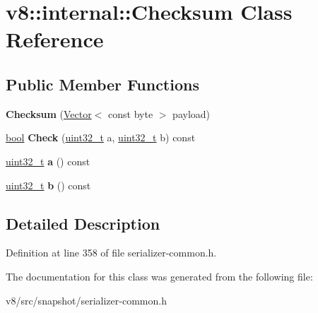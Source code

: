 \hypertarget{classv8_1_1internal_1_1Checksum}{}\section{v8\+:\+:internal\+:\+:Checksum Class Reference}
\label{classv8_1_1internal_1_1Checksum}
\subsection*{Public Member Functions}
\begin{DoxyCompactItemize}
\item 
\mbox{\label{classv8_1_1internal_1_1Checksum_a989a219adbdba78fece07f09cfc4f5cd}} 
{\bfseries Checksum} (\mbox{\hyperlink{classv8_1_1internal_1_1Vector}{Vector}}$<$ const byte $>$ payload)
\item 
\mbox{\label{classv8_1_1internal_1_1Checksum_a639705c94ad38831fda416b387fca7e8}} 
\mbox{\hyperlink{classbool}{bool}} {\bfseries Check} (\mbox{\hyperlink{classuint32__t}{uint32\+\_\+t}} a, \mbox{\hyperlink{classuint32__t}{uint32\+\_\+t}} b) const
\item 
\mbox{\label{classv8_1_1internal_1_1Checksum_ae88f80e5d36a14d43f4c222aefa996df}} 
\mbox{\hyperlink{classuint32__t}{uint32\+\_\+t}} {\bfseries a} () const
\item 
\mbox{\label{classv8_1_1internal_1_1Checksum_a5091c4af7e9ca27e1ad3cced163c406a}} 
\mbox{\hyperlink{classuint32__t}{uint32\+\_\+t}} {\bfseries b} () const
\end{DoxyCompactItemize}


\subsection{Detailed Description}


Definition at line 358 of file serializer-\/common.\+h.



The documentation for this class was generated from the following file\+:\begin{DoxyCompactItemize}
\item 
v8/src/snapshot/serializer-\/common.\+h\end{DoxyCompactItemize}
